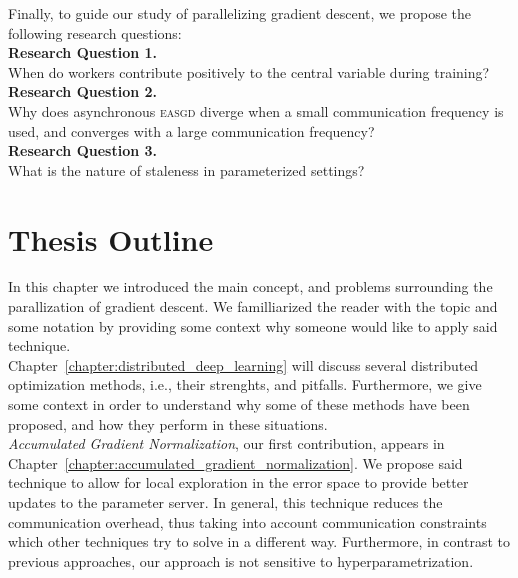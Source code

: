 \begin{figure}[H]
\label{fig:problem_statement_particles}
\end{figure}

\newpage
Finally, to guide our study of parallelizing gradient descent, we propose the following research questions:\\

\noindent \textbf{Research Question 1.}\\When do workers contribute positively to the central variable during training?\\

\noindent \textbf{Research Question 2.}\\Why does asynchronous \textsc{easgd} diverge when a small communication frequency is used, and converges with a large communication frequency?\\

\noindent \textbf{Research Question 3.}\\What is the nature of staleness in parameterized settings?

\section{Thesis Outline}
\label{sec:thesis_outline}

In this chapter we introduced the main concept, and problems surrounding the parallization of gradient
descent. We familliarized the reader with the topic and some notation by providing some context why
someone would like to apply said technique.\\

Chapter~\ref{chapter:distributed_deep_learning} will discuss several distributed optimization methods, i.e., their strenghts, and pitfalls. Furthermore, we give some context in order to understand why some of these methods have been proposed, and how they perform in these situations.\\

\emph{Accumulated Gradient Normalization}, our first contribution, appears in Chapter~\ref{chapter:accumulated_gradient_normalization}. We propose said technique to allow for local exploration in the error space to provide better updates to the parameter server. In general, this technique reduces the communication overhead, thus taking into account communication constraints which other techniques try to solve in a different way. Furthermore, in contrast to previous approaches, our approach is not sensitive to hyperparametrization.\\

